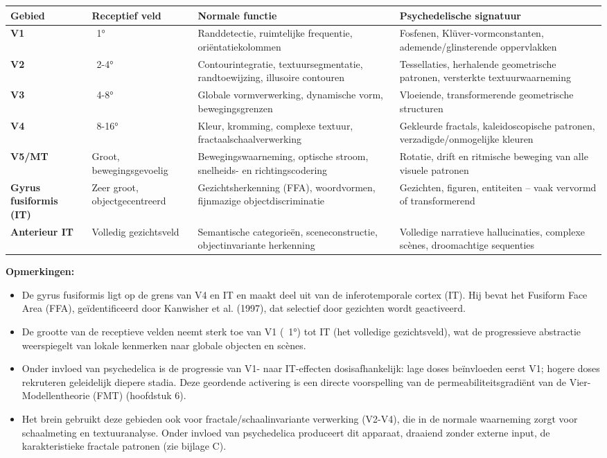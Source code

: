 \documentclass[11pt, twoside, openright]{book}
\begin{document}
\small
\begin{xltabular}{\linewidth}{X X X X}
\toprule
\textbf{Gebied} & \textbf{Receptief veld} & \textbf{Normale functie} & \textbf{Psychedelische signatuur} \\
\midrule\endhead
\textbf{V1} & ~1° & Randdetectie, ruimtelijke frequentie, oriëntatiekolommen & Fosfenen, Klüver-vormconstanten, ademende/\allowbreak{}glinsterende oppervlakken \\[4pt]
\textbf{V2} & ~2-4° & Contourintegratie, textuursegmentatie, randtoewijzing, illusoire contouren & Tessellaties, herhalende geometrische patronen, versterkte textuurwaarneming \\[4pt]
\textbf{V3} & ~4-8° & Globale vormverwerking, dynamische vorm, bewegingsgrenzen & Vloeiende, transformerende geometrische structuren \\[4pt]
\textbf{V4} & ~8-16° & Kleur, kromming, complexe textuur, fractaalschaalverwerking & Gekleurde fractals, kaleidoscopische patronen, verzadigde/\allowbreak{}onmogelijke kleuren \\[4pt]
\textbf{V5/\allowbreak{}MT} & Groot, bewegingsgevoelig & Bewegingswaarneming, optische stroom, snelheids- en richtingscodering & Rotatie, drift en ritmische beweging van alle visuele patronen \\[4pt]
\textbf{Gyrus fusiformis (IT)} & Zeer groot, objectgecentreerd & Gezichtsherkenning (FFA), woordvormen, fijnmazige objectdiscriminatie & Gezichten, figuren, entiteiten -- vaak vervormd of transformerend \\[4pt]
\textbf{Anterieur IT} & Volledig gezichtsveld & Semantische categorieën, sceneconstructie, objectinvariante herkenning & Volledige narratieve hallucinaties, complexe scènes, droomachtige sequenties \\[4pt]
\bottomrule
\end{xltabular}
\normalsize


\textbf{Opmerkingen:}
\begin{itemize}
  \item De gyrus fusiformis ligt op de grens van V4 en IT en maakt deel uit van de inferotemporale cortex (IT). Hij bevat het Fusiform Face Area (FFA), geïdentificeerd door Kanwisher et al. (1997), dat selectief door gezichten wordt geactiveerd.
  \item De grootte van de receptieve velden neemt sterk toe van V1 (~1°) tot IT (het volledige gezichtsveld), wat de progressieve abstractie weerspiegelt van lokale kenmerken naar globale objecten en scènes.
  \item Onder invloed van psychedelica is de progressie van V1- naar IT-effecten dosisafhankelijk: lage doses beïnvloeden eerst V1; hogere doses rekruteren geleidelijk diepere stadia. Deze geordende activering is een directe voorspelling van de permeabiliteitsgradiënt van de Vier-Modellentheorie (FMT) (hoofdstuk 6).
  \item Het brein gebruikt deze gebieden ook voor fractale/\allowbreak{}schaalinvariante verwerking (V2-V4), die in de normale waarneming zorgt voor schaalmeting en textuuranalyse. Onder invloed van psychedelica produceert dit apparaat, draaiend zonder externe input, de karakteristieke fractale patronen (zie bijlage C).
\end{itemize}
\end{document}
